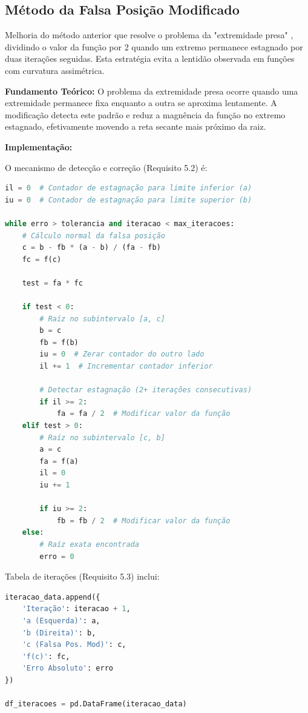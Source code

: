 \documentclass[
	12pt,				%
	openright,			%
	oneside,			%
	a4paper,			%
	english,			%
	brazil				%
	]{abntex2}
\begin{document}
\subsection{Método da Falsa Posição Modificado}

Melhoria do método anterior que resolve o problema da "extremidade presa" \cite{ruggiero2004}, dividindo o valor da função por 2 quando um extremo permanece estagnado por duas iterações seguidas. Esta estratégia evita a lentidão observada em funções com curvatura assimétrica.

\textbf{Fundamento Teórico:}
O problema da extremidade presa ocorre quando uma extremidade permanece fixa enquanto a outra se aproxima lentamente. A modificação detecta este padrão e reduz a magnência da função no extremo estagnado, efetivamente movendo a reta secante mais próximo da raiz.

\vspace{0.3cm}

\textbf{Implementação:}

O mecanismo de detecção e correção (Requisito 5.2) é:

\begin{lstlisting}[language=Python, caption={Requisito 5.2 - Detecção de Extremidade Presa}]
il = 0  # Contador de estagnação para limite inferior (a)
iu = 0  # Contador de estagnação para limite superior (b)

while erro > tolerancia and iteracao < max_iteracoes:
    # Cálculo normal da falsa posição
    c = b - fb * (a - b) / (fa - fb)
    fc = f(c)
    
    test = fa * fc
    
    if test < 0:
        # Raíz no subintervalo [a, c]
        b = c
        fb = f(b)
        iu = 0  # Zerar contador do outro lado
        il += 1  # Incrementar contador inferior
        
        # Detectar estagnação (2+ iterações consecutivas)
        if il >= 2:
            fa = fa / 2  # Modificar valor da função
    elif test > 0:
        # Raíz no subintervalo [c, b]
        a = c
        fa = f(a)
        il = 0
        iu += 1
        
        if iu >= 2:
            fb = fb / 2  # Modificar valor da função
    else:
        # Raíz exata encontrada
        erro = 0
\end{lstlisting}

Tabela de iterações (Requisito 5.3) inclui:

\begin{lstlisting}[language=Python, caption={Requisito 5.3 - Armazenamento de Iterações}]
iteracao_data.append({
    'Iteração': iteracao + 1,
    'a (Esquerda)': a,
    'b (Direita)': b,
    'c (Falsa Pos. Mod)': c,
    'f(c)': fc,
    'Erro Absoluto': erro
})

df_iteracoes = pd.DataFrame(iteracao_data)
\end{lstlisting}
\end{document}
